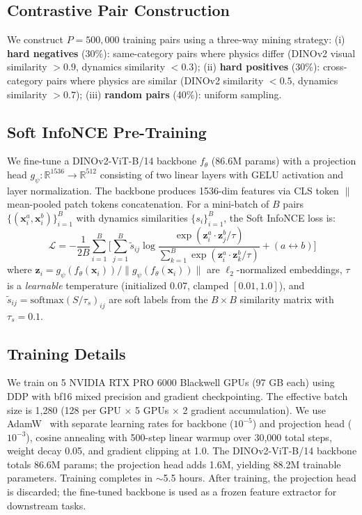 \documentclass{article}
\newcommand{\reals}{\mathbb{R}}
\begin{document}
\subsection{Contrastive Pair Construction}
\label{sec:pairs}

We construct $P{=}500{,}000$ training pairs using a three-way mining strategy: (i) \textbf{hard negatives} (30\%): same-category pairs where physics differ (DINOv2 visual similarity $> 0.9$, dynamics similarity $< 0.3$); (ii) \textbf{hard positives} (30\%): cross-category pairs where physics are similar (DINOv2 similarity $< 0.5$, dynamics similarity $> 0.7$); (iii) \textbf{random pairs} (40\%): uniform sampling.


\subsection{Soft InfoNCE Pre-Training}
\label{sec:loss}

We fine-tune a DINOv2-ViT-B/14 backbone $f_\theta$ (86.6M params) with a projection head $g_\psi: \reals^{1536} \to \reals^{512}$ consisting of two linear layers with GELU activation and layer normalization. The backbone produces 1536-dim features via CLS token $\|$ mean-pooled patch tokens concatenation. For a mini-batch of $B$ pairs $\{(\mathbf{x}_i^a, \mathbf{x}_i^b)\}_{i=1}^B$ with dynamics similarities $\{s_i\}_{i=1}^B$, the Soft InfoNCE loss is:
\begin{equation}
    \mathcal{L} = -\frac{1}{2B} \sum_{i=1}^{B} \bigg[
        \sum_{j=1}^{B} \tilde{s}_{ij} \log \frac{\exp(\mathbf{z}_i^a \cdot \mathbf{z}_j^b / \tau)}{\sum_{k=1}^{B} \exp(\mathbf{z}_i^a \cdot \mathbf{z}_k^b / \tau)}
        + (a \leftrightarrow b)
    \bigg]
    \label{eq:loss}
\end{equation}
where $\mathbf{z}_i = g_\psi(f_\theta(\mathbf{x}_i)) / \|g_\psi(f_\theta(\mathbf{x}_i))\|$ are $\ell_2$-normalized embeddings, $\tau$ is a \emph{learnable} temperature (initialized 0.07, clamped $[0.01, 1.0]$), and $\tilde{s}_{ij} = \text{softmax}(S / \tau_s)_{ij}$ are soft labels from the $B \times B$ similarity matrix with $\tau_s = 0.1$.


\subsection{Training Details}
\label{sec:training}

We train on 5 NVIDIA RTX PRO 6000 Blackwell GPUs (97 GB each) using DDP with bf16 mixed precision and gradient checkpointing. The effective batch size is 1,280 (128 per GPU $\times$ 5 GPUs $\times$ 2 gradient accumulation). We use AdamW~\cite{loshchilov2019adamw} with separate learning rates for backbone ($10^{-5}$) and projection head ($10^{-3}$), cosine annealing with 500-step linear warmup over 30,000 total steps, weight decay 0.05, and gradient clipping at 1.0. The DINOv2-ViT-B/14 backbone totals 86.6M params; the projection head adds 1.6M, yielding 88.2M trainable parameters. Training completes in ${\sim}$5.5 hours. After training, the projection head is discarded; the fine-tuned backbone is used as a frozen feature extractor for downstream tasks.
\end{document}
